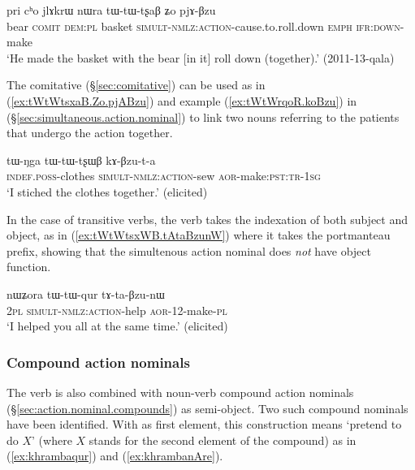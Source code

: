 \begin{exe}
	\ex \label{ex:tWtWtsxaB.Zo.pjABzu}
	\gll  pri cʰo jlɤkrɯ nɯra tɯ-tɯ-tʂaβ ʑo pjɤ-βzu  \\
	bear \textsc{comit} \textsc{dem}:\textsc{pl}  basket  \textsc{simult}-\textsc{nmlz}:\textsc{action}-cause.to.roll.down \textsc{emph} \textsc{ifr}:\textsc{down}-make \\
	\glt `He made the basket with the bear [in it] roll down (together).' (2011-13-qala) 
\end{exe}

The comitative (§\ref{sec:comitative}) can be used as in (\ref{ex:tWtWtsxaB.Zo.pjABzu}) and example  (\ref{ex:tWtWrqoR.koBzu}) in  (§\ref{sec:simultaneous.action.nominal}) to link two nouns referring to the patients that undergo the action together.

\begin{exe}
	\ex \label{ex:tWtWtsxWB.kABzuta}
	\gll   tɯ-ŋga tɯ-tɯ-tʂɯβ kɤ-βzu-t-a \\
	\textsc{indef}.\textsc{poss}-clothes \textsc{simult}-\textsc{nmlz}:\textsc{action}-sew \textsc{aor}-make:\textsc{pst}:\textsc{tr}-\textsc{1sg} \\
	\glt `I stiched the clothes together.' (elicited)
\end{exe}

In the case of transitive verbs, the verb  takes the indexation of both subject and object, as in (\ref{ex:tWtWtsxWB.tAtaBzunW}) where it takes the portmanteau  prefix, showing that the simultenous action nominal does \textit{not} have object function.

\begin{exe}
	\ex \label{ex:tWtWtsxWB.tAtaBzunW}
	\gll nɯʑora tɯ-tɯ-qur tɤ-ta-βzu-nɯ \\
	\textsc{2pl} \textsc{simult}-\textsc{nmlz}:\textsc{action}-help \textsc{aor}-1\fl{}2-make-\textsc{pl} \\
	\glt `I helped you all at the same time.' (elicited)
\end{exe}  

\subsubsection{Compound action nominals} \label{sec:compound.action.nominal.Bzu}
The verb  is also combined with noun-verb compound action nominals (§\ref{sec:action.nominal.compounds}) as semi-object. Two such compound nominals have been identified. With  as first element, this construction means `pretend to do $X$' (where $X$ stands for the second element of the compound) as in (\ref{ex:khrambaqur}) and (\ref{ex:khrambanAre}). 

